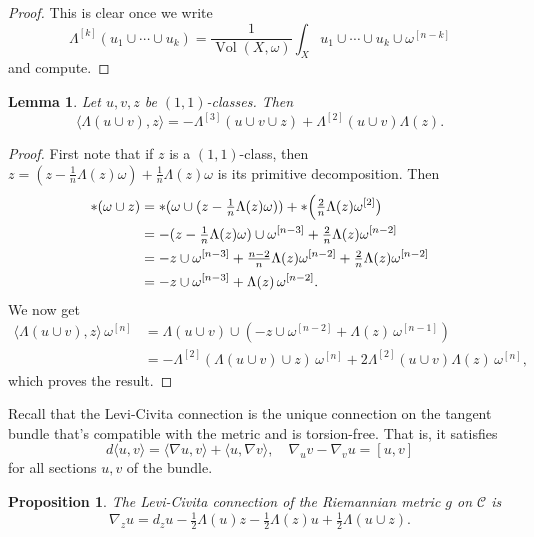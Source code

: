 \documentclass[12pt,a4paper]{amsart}
\newtheorem{prop}[theo]{Proposition}
\newtheorem{lemm}[theo]{Lemma}
\theoremstyle{definition}
\theoremstyle{remark}
\newcommand{\Vol}{\mathop{\mathrm{Vol}}}
\def\levi{\nabla}
\def\kf{\omega}
\def\Lef{\Lambda}
\def\ton{u}
\def\ttw{v}
\def\tth{z}
\def\^#1{^{[#1]}}
\def\KC{C}
\def\RKC{\mathcal{\KC}}
\begin{document}
\begin{proof}
This is clear once we write
$$
\Lef\^{k}(u_1 \cup \cdots \cup u_k)
= \frac{1}{\Vol(X,\kf)} \int_X u_1 \cup \cdots \cup u_k \cup \kf\^{n-k}
$$
and compute.
\end{proof}

\begin{lemm}
\label{lemm:triple}
Let $\ton,\ttw,\tth$ be $(1,1)$-classes. Then
$$
\langle \Lef(\ton\cup\ttw), \tth \rangle
= - \Lef\^3(\ton \cup \ttw \cup \tth)
+ \Lef\^2(\ton \cup \ttw) \Lef(\tth).
$$
\end{lemm}


\begin{proof}
First note that if $\tth$ is a $(1,1)$-class, then $\tth = (\tth -
\frac1n \Lef(\tth)\kf) + \frac1n \Lef(\tth) \kf$ is its primitive
decomposition. Then
\begin{align*}
*(\kf \cup \tth)
&= *( \kf \cup (\tth - \tfrac1n \Lef(\tth)\kf))
+ * \Bigl( \tfrac{2}{n} \Lef(\tth) \kf\^2 \bigr)
\\
&= -(\tth - \tfrac1n \Lef(\tth)\kf) \cup \kf\^{n-3}
+ \tfrac{2}{n} \Lef(\tth) \kf\^{n-2}
\\
&= -\tth \cup \kf\^{n-3}
+ \tfrac{n-2}{n} \Lef(\tth) \kf\^{n-2}
+ \tfrac{2}{n} \Lef(\tth) \kf\^{n-2}
\\
&= -\tth \cup \kf\^{n-3}
+ \Lef(\tth)\, \kf\^{n-2}.
\end{align*}
We now get
\begin{align*}
\langle \Lef(\ton \cup \ttw), \tth \rangle \,\kf\^n
&= \Lef(\ton \cup \ttw) \cup 
(-\tth \cup \kf\^{n-2} + \Lef(\tth)\, \kf\^{n-1})
\\
&= - \Lef\^2(\Lef(\ton \cup \ttw) \cup \tth) \,\kf\^{n}
+ 2 \Lef\^2(\ton \cup \ttw) \Lef(\tth) \,\kf\^{n},
\end{align*}
which proves the result.
\end{proof}


Recall that the Levi-Civita connection is the unique connection on the tangent
bundle that's compatible with the metric and is torsion-free. That is, it
satisfies
$$
d \langle\ton, \ttw\rangle 
= \langle\levi \ton, \ttw\rangle + \langle\ton, \levi \ttw\rangle,
\quad
\levi_{\ton}\ttw - \levi_{\ttw}\ton = [\ton,\ttw]
$$
for all sections $\ton, \ttw$ of the bundle.


\begin{prop}
\label{prop:connection}
The Levi-Civita connection of the Riemannian metric $g$ on $\RKC$ is
$$
\levi_{\tth} \ton
=
d_\tth \ton
-\tfrac12 \Lef(\ton) \tth
-\tfrac12 \Lef(\tth) \ton
+\tfrac12 \Lef(\ton \cup \tth).
$$
\end{prop}
\end{document}
